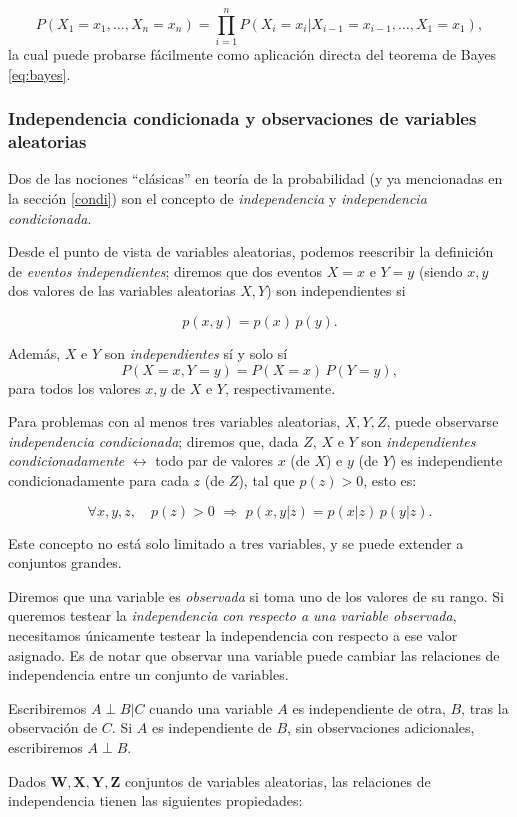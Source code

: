 $$P(X_1=x_1, \dots, X_n=x_n) = \prod_{i=1}^n P(X_i=x_i|X_{i-1}=x_{i-1}, \dots, X_1=x_1),$$ la cual puede 
probarse fácilmente como aplicación directa del teorema de Bayes \ref{eq:bayes}.

\subsubsection{Independencia condicionada y observaciones de variables aleatorias}

Dos de las nociones ``clásicas'' en teoría de la probabilidad (y ya mencionadas en la sección \ref{condi}) son 
el concepto de {\em independencia} y {\em independencia condicionada}. 

Desde el punto de vista de variables aleatorias, podemos reescribir la definición de {\em eventos independientes}; 
diremos que dos eventos $X=x$ e $Y=y$ (siendo $x,y$ dos valores de las variables aleatorias $X,Y$) son 
independientes si 

$$p(x,y) = p(x) \, p(y).$$

Además, $X$ e $Y$ son {\em independientes} sí y solo sí $$P(X=x, Y=y) = P(X=x) \, P(Y=y),$$ 
para todos los valores $x,y$ de $X$ e $Y$, respectivamente.

Para problemas con al menos tres variables aleatorias, $X,Y,Z$, puede observarse {\em independencia 
condicionada}; diremos que, dada $Z$, $X$ e $Y$ son {\em independientes condicionadamente } $\leftrightarrow$ todo par 
de valores $x$ (de $X$) e $y$ (de $Y$) es independiente condicionadamente para cada $z$ (de $Z$), tal que 
$p(z) > 0$, esto es:

$$\forall x, y, z, \quad p(z) > 0 \,\, \Rightarrow \,\, p(x,y|z) = p(x|z)\, p(y|z).$$

Este concepto no está solo limitado a tres variables, y se puede extender a conjuntos grandes.

Diremos que una variable es {\em observada} si toma uno de los valores de su rango. Si queremos testear la {\em 
independencia con respecto a una variable observada}, necesitamos únicamente testear la independencia con respecto 
a ese valor asignado. Es de notar que observar una variable puede cambiar las relaciones de independencia entre
un conjunto de variables.

Escribiremos $A\perp B | C$ cuando una variable $A$ es independiente de otra, $B$, tras la observación de $C$. Si 
$A$ es independiente de $B$, sin observaciones adicionales, escribiremos $A \perp B$.

Dados $\mathbf{W, X, Y, Z}$ conjuntos de variables aleatorias, las relaciones de independencia tienen 
las siguientes propiedades:

